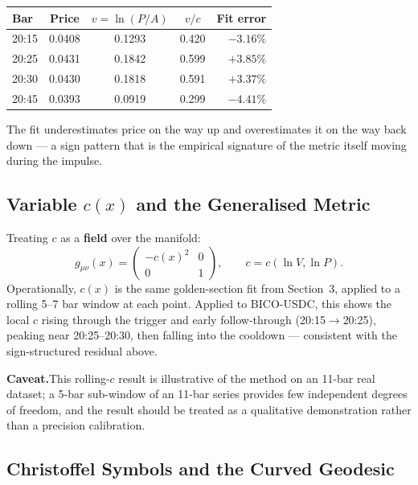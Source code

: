 \documentclass[12pt,a4paper]{article}
\begin{document}
\begin{center}
\begin{tabular}{lcccr}
\toprule
Bar & Price & $v=\ln(P/A)$ & $v/c$ & Fit error \\
\midrule
20:15 & 0.0408 & 0.1293 & 0.420 & $-3.16\%$ \\
20:25 & 0.0431 & 0.1842 & 0.599 & $+3.85\%$ \\
20:30 & 0.0430 & 0.1818 & 0.591 & $+3.37\%$ \\
20:45 & 0.0393 & 0.0919 & 0.299 & $-4.41\%$ \\
\bottomrule
\end{tabular}
\end{center}

The fit underestimates price on the way up and overestimates it on the
way back down --- a sign pattern that is the empirical signature of
the metric itself moving during the impulse.

\subsection{Variable \texorpdfstring{$c(x)$}{c(x)} and the Generalised Metric}

Treating $c$ as a \textbf{field} over the manifold:
\begin{equation}
    g_{\mu\nu}(x) = \begin{pmatrix} -c(x)^2 & 0 \\ 0 & 1 \end{pmatrix},
    \qquad c=c(\ln V,\ln P).
\end{equation}
Operationally, $c(x)$ is the same golden-section fit from Section~3,
applied to a rolling 5--7 bar window at each point. Applied to BICO-USDC,
this shows the local $c$ rising through the trigger and early
follow-through (20:15$\to$20:25), peaking near 20:25--20:30, then falling
into the cooldown --- consistent with the sign-structured residual above.

\textbf{Caveat.}\quad This rolling-$c$ result is illustrative of the
method on an 11-bar real dataset; a 5-bar sub-window of an 11-bar series
provides few independent degrees of freedom, and the result should be
treated as a qualitative demonstration rather than a precision
calibration.

\subsection{Christoffel Symbols and the Curved Geodesic}
\end{document}
